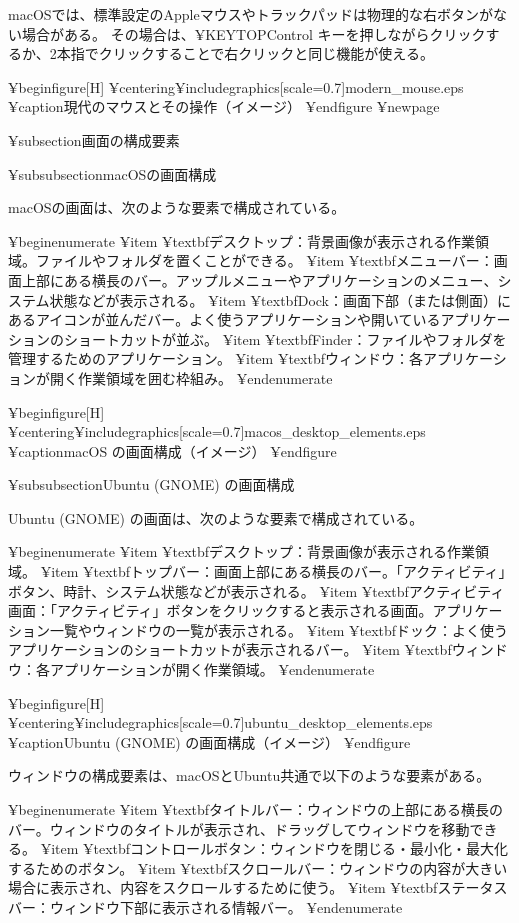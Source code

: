 macOSでは、標準設定のAppleマウスやトラックパッドは物理的な右ボタンがない場合がある。
その場合は、¥KEYTOP{Control} キーを押しながらクリックするか、2本指でクリックすることで右クリックと同じ機能が使える。

¥begin{figure}[H]
¥centering{¥includegraphics[scale=0.7]{modern_mouse.eps}}
¥caption{現代のマウスとその操作（イメージ）}
¥end{figure}
¥newpage

¥subsection{画面の構成要素}

¥subsubsection{macOSの画面構成}

macOSの画面は、次のような要素で構成されている。

¥begin{enumerate}
¥item ¥textbf{デスクトップ}：背景画像が表示される作業領域。ファイルやフォルダを置くことができる。
¥item ¥textbf{メニューバー}：画面上部にある横長のバー。アップルメニューやアプリケーションのメニュー、システム状態などが表示される。
¥item ¥textbf{Dock}：画面下部（または側面）にあるアイコンが並んだバー。よく使うアプリケーションや開いているアプリケーションのショートカットが並ぶ。
¥item ¥textbf{Finder}：ファイルやフォルダを管理するためのアプリケーション。
¥item ¥textbf{ウィンドウ}：各アプリケーションが開く作業領域を囲む枠組み。
¥end{enumerate}

¥begin{figure}[H]
¥centering{¥includegraphics[scale=0.7]{macos_desktop_elements.eps}}
¥caption{macOS の画面構成（イメージ）}
¥end{figure}

¥subsubsection{Ubuntu (GNOME) の画面構成}

Ubuntu (GNOME) の画面は、次のような要素で構成されている。

¥begin{enumerate}
¥item ¥textbf{デスクトップ}：背景画像が表示される作業領域。
¥item ¥textbf{トップバー}：画面上部にある横長のバー。「アクティビティ」ボタン、時計、システム状態などが表示される。
¥item ¥textbf{アクティビティ画面}：「アクティビティ」ボタンをクリックすると表示される画面。アプリケーション一覧やウィンドウの一覧が表示される。
¥item ¥textbf{ドック}：よく使うアプリケーションのショートカットが表示されるバー。
¥item ¥textbf{ウィンドウ}：各アプリケーションが開く作業領域。
¥end{enumerate}

¥begin{figure}[H]
¥centering{¥includegraphics[scale=0.7]{ubuntu_desktop_elements.eps}}
¥caption{Ubuntu (GNOME) の画面構成（イメージ）}
¥end{figure}

ウィンドウの構成要素は、macOSとUbuntu共通で以下のような要素がある。

¥begin{enumerate}
¥item ¥textbf{タイトルバー}：ウィンドウの上部にある横長のバー。ウィンドウのタイトルが表示され、ドラッグしてウィンドウを移動できる。
¥item ¥textbf{コントロールボタン}：ウィンドウを閉じる・最小化・最大化するためのボタン。
¥item ¥textbf{スクロールバー}：ウィンドウの内容が大きい場合に表示され、内容をスクロールするために使う。
¥item ¥textbf{ステータスバー}：ウィンドウ下部に表示される情報バー。
¥end{enumerate}

